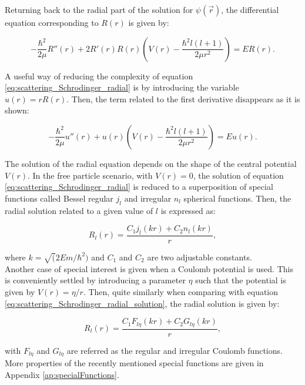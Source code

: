 \documentclass[openany]{book}
\begin{document}
Returning back to the radial part of the solution for $\psi(\vec r)$, the differential equation corresponding to $R(r)$ is given by:

\begin{equation}\label{eq:scattering_Schrodinger_radial}
	- \frac{\hbar^2}{2 \mu}R''(r)  + 2R'(r) R(r) \left( V(r)  - \frac{\hbar^2l(l+1)}{2 \mu r^2}  \right  ) = E R(r).
\end{equation}

A useful way of reducing the complexity of equation \ref{eq:scattering_Schrodinger_radial} is by introducing the variable $u(r) = rR(r)$. Then, the term related to the first derivative disappears as it is shown:  

\begin{equation}\label{eq:scattering_Schrodinger_radial_u}
	- \frac{\hbar^2}{2 \mu}u''(r)  + u(r) \left( V(r)  - \frac{\hbar^2l(l+1)}{2 \mu r^2}  \right  ) = E u(r).
\end{equation}

The solution of the radial equation depends on the shape of the central potential $V(r)$. In the free particle scenario, with $V(r) = 0$, the solution of equation \ref{eq:scattering_Schrodinger_radial} is reduced to a superposition of special functions called Bessel regular $j_l$ and irregular $n_l$ spherical functions. Then, the radial solution related to a given value of $l$ is expressed as:


\begin{equation}\label{eq:scattering_Schrodinger_radial_solution}
	R_l(r) = \frac{C_1j_l(kr) + C_2n_l(kr)}{r},
\end{equation}

where $k = \sqrt(2Em/\hbar^2)$ and $C_1$ and $C_2$ are two adjustable constants. \\

Another case of special interest is given when a Coulomb potential is used. This is conveniently settled by introducing a parameter $\eta$ such that the potential is given by $V(r) = \eta/r$. Then, quite similarly when comparing with equation \ref{eq:scattering_Schrodinger_radial_solution}, the radial solution is given by: 

\begin{equation}\label{eq:scattering_Schrodinger_radial_solution_coulomb}
	R_l(r) = \frac{C_1F_{l\eta}(kr) + C_2 G_{l\eta}(kr)}{r},
\end{equation}

with $F_{l\eta}$ and $G_{l\eta}$ are referred as the regular and irregular Coulomb functions. More properties of the recently mentioned special functions are given in Appendix \ref{ap:specialFunctions}. \\
\end{document}
